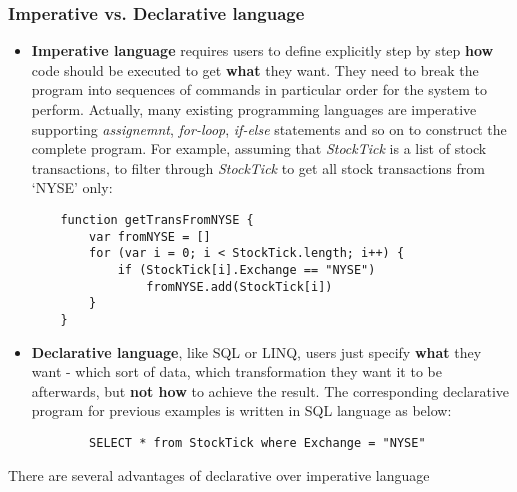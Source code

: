 \subsubsection*{Imperative vs. Declarative language}
\begin{itemize}
	\item \textbf{Imperative language} requires users to define explicitly step by step \textbf{how} code should be executed to get \textbf{what} they want. They need to break the program into sequences of commands in particular order for the system to perform. Actually, many existing programming languages are imperative supporting \textit{assignemnt}, \textit{for-loop}, \textit{if-else} statements and so on to construct the complete program. For example, assuming that \textit{StockTick} is a  list of stock transactions,  to filter through \textit{StockTick} to get all stock transactions from `NYSE' only: 
\begin{lstlisting}
	function getTransFromNYSE {
		var fromNYSE = []
		for (var i = 0; i < StockTick.length; i++) {
			if (StockTick[i].Exchange == "NYSE")
				fromNYSE.add(StockTick[i])
		}
	}
\end{lstlisting}
	\item \textbf{Declarative language}, like SQL or LINQ, users just specify \textbf{what} they want - which sort of data, which transformation they want it to be afterwards, but \textbf{not how} to achieve the result. The corresponding declarative program for previous examples is written in SQL language as below:
	\begin{verbatim}
		SELECT * from StockTick where Exchange = "NYSE"
	\end{verbatim}
\end{itemize}

There are several advantages of declarative over imperative language \citep{Martin:2014}

